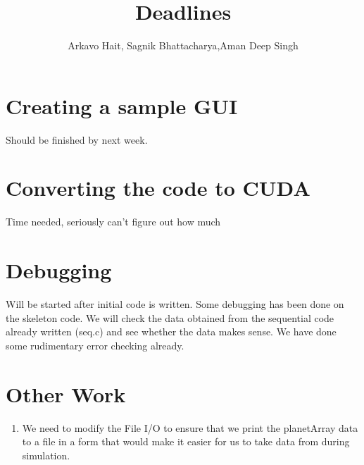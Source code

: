 \documentclass{article}
\title{Deadlines}
\author{Arkavo Hait, Sagnik Bhattacharya,Aman Deep Singh}
\begin{document}
  \maketitle
  \section*{Creating a sample GUI}
  Should be finished by next week.
  \section*{Converting the code to CUDA}
  Time needed, seriously can't figure out how much
  \section*{Debugging}
  Will be started after initial code is written. Some debugging has been
  done on the skeleton code. We will check the data obtained from the
  sequential code already written (seq.c) and see whether the data makes
  sense. We have done some rudimentary error checking already.
  \section*{Other Work}
  \begin{enumerate}
    \item We need to modify the File I/O to ensure that we print the planetArray data
    to a file in a form that would make it easier for us to take data from during
    simulation.

  \end{enumerate}
\end{document}
